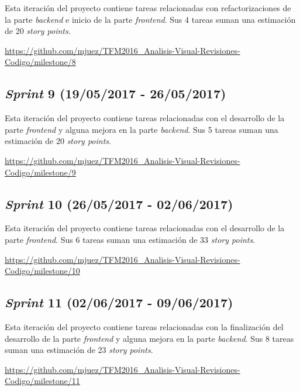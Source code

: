 Esta iteración del proyecto contiene tareas relacionadas con refactorizaciones de la parte \textit{backend} e inicio de la parte \textit{frontend}. Sus 4 tareas suman una estimación de 20 \textit{story points}.

\url{https://github.com/mjuez/TFM2016_Analisis-Visual-Revisiones-Codigo/milestone/8}


\subsection{\textit{Sprint} 9 (19/05/2017 - 26/05/2017)}

Esta iteración del proyecto contiene tareas relacionadas con el desarrollo de la parte \textit{frontend} y alguna mejora en la parte \textit{backend}. Sus 5 tareas suman una estimación de 20 \textit{story points}.

\url{https://github.com/mjuez/TFM2016_Analisis-Visual-Revisiones-Codigo/milestone/9}


\subsection{\textit{Sprint} 10 (26/05/2017 - 02/06/2017)}

Esta iteración del proyecto contiene tareas relacionadas con el desarrollo de la parte \textit{frontend}. Sus 6 tareas suman una estimación de 33 \textit{story points}.

\url{https://github.com/mjuez/TFM2016_Analisis-Visual-Revisiones-Codigo/milestone/10}


\subsection{\textit{Sprint} 11 (02/06/2017 - 09/06/2017)}

Esta iteración del proyecto contiene tareas relacionadas con la finalización del desarrollo de la parte \textit{frontend} y alguna mejora en la parte \textit{backend}. Sus 8 tareas suman una estimación de 23 \textit{story points}.

\url{https://github.com/mjuez/TFM2016_Analisis-Visual-Revisiones-Codigo/milestone/11}

